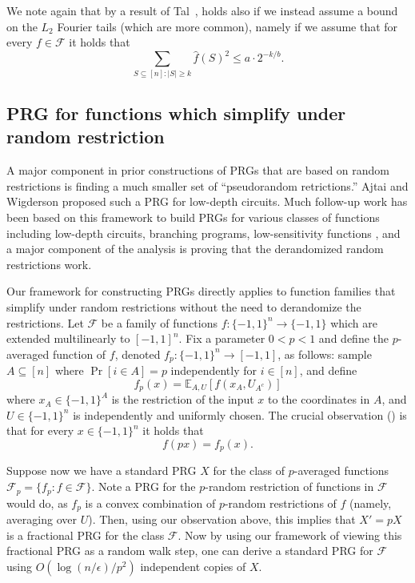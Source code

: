 \documentclass{toc}
\newcommand{\E}{\mathbb{E}}
\newcommand{\FF}{\mathcal{F}}
\begin{document}
%
%
We note again that by a result of Tal~\cite{tal2017tight},  holds also if we instead assume a bound on the $L_2$ Fourier tails
(which are more common), namely if we assume that for every
$f \in \FF$ it holds that
$$
\sum_{S \subseteq [n]: |S| \ge k} \hat{f}(S)^2 \le a \cdot 2^{-k/b}.
$$

\subsection{PRG for functions which simplify under random restriction}
A major component in prior constructions of PRGs that are based on random restrictions is finding a much smaller set of ``pseudorandom retrictions.'' Ajtai and Wigderson \cite{ajtai1985deterministic} proposed such a PRG for
%
low-depth circuits.   %
%
Much follow-up work has been  %
based on this framework to build PRGs for various classes of functions including
%
low-depth      %
circuits, branching programs, low-sensitivity functions \cite{trevisan2013derandomized,gopalan2012better,reingold2013pseudorandomness,chattopadhyay2018improved, hatami2017pseudorandom}, and  a major component of the analysis is proving that the derandomized random restrictions work.

Our framework for constructing PRGs directly applies to function families that simplify under random restrictions without the need to derandomize the restrictions.  Let $\FF$ be a family of functions  $f:\{-1,1\}^n \to \{-1,1\}$  which are extended multilinearly to $[-1,1]^n$. Fix a parameter $0<p<1$ and define the $p$-averaged function of $f$, denoted $f_p:\{-1,1\}^n \to [-1,1]$, as follows:
sample $A \subseteq [n]$ where $\Pr[i \in A]=p$ independently for $i \in [n]$, and define
$$f_p(x) = \E_{A,U} [f(x_A,U_{A^c})]$$
where $x_A \in \{-1,1\}^A$ is the restriction of the input $x$ to the coordinates in $A$, and $U \in \{-1,1\}^n$ is independently and uniformly chosen. The crucial observation ()
is that for every $x \in \{-1,1\}^n$ it holds that
$$
f(px) = f_p(x).
$$

Suppose now we have a standard PRG $X$ for the class of $p$-averaged functions $\FF_p = \{f_p : f\in \FF\}$. Note a PRG for the $p$-random restriction of functions in $\FF$ would do,
%
%
as $f_p$ is a convex combination of $p$-random restrictions of $f$ (namely, averaging over $U$). Then, using our observation above,  this implies that $X'=pX$ is a fractional PRG for the class $\FF$. Now by using our framework of viewing this fractional PRG as a random walk step, one can derive a standard PRG for $\FF$ using $O(\log(n/\epsilon)/p^2)$ independent copies of $X$.
\end{document}
